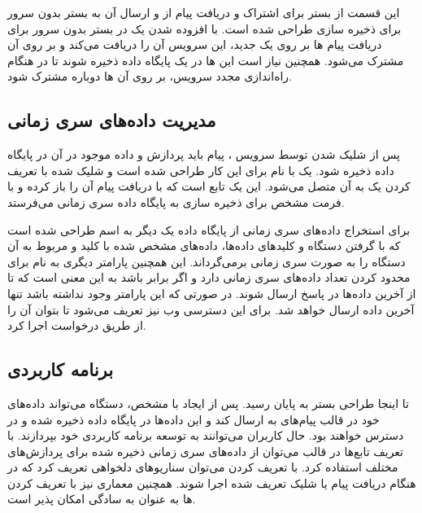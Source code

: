 این قسمت از بستر برای اشتراک و دریافت پیام از   و ارسال آن به بستر بدون سرور برای ذخیره سازی طراحی شده است. با افزوده شدن یک  در بستر بدون سرور برای دریافت پیام ها بر روی یک  جدید، این سرویس آن را دریافت می‌کند و بر روی آن  مشترک می‌شود. همچنین نیاز است این  ها در یک پایگاه داده ذخیره شوند تا در هنگام راه‌اندازی مجدد سرویس، بر روی آن  ها دوباره مشترک شود.

\subsection{مدیریت داده‌های سری زمانی}

پس از شلیک شدن  توسط سرویس ، پیام باید پردازش و داده موجود در آن در پایگاه داده ذخیره شود. یک  با نام  برای این کار طراحی شده‌ است و  شلیک شده با تعریف کردن یک  به آن متصل می‌شود. این  یک تابع است که با دریافت پیام آن را باز کرده و با فرمت مشخص برای ذخیره سازی به پایگاه داده سری زمانی می‌فرستد.

برای استخراج داده‌های سری زمانی از پایگاه داده یک  دیگر به اسم  طراحی شده است که با گرفتن  دستگاه و کلید‌های داده‌ها، داده‌های مشخص شده با کلید و مربوط به آن دستگاه را به صورت سری زمانی برمی‌گرداند. این  همچنین پارامتر دیگری به نام  برای محدود کردن تعداد داده‌های سری زمانی دارد و اگر برابر  باشد به این معنی است که  تا از آخرین داده‌ها در پاسخ ارسال شوند. در صورتی که این پارامتر وجود نداشته باشد تنها آخرین داده ارسال خواهد شد. برای این  دسترسی وب نیز تعریف می‌شود تا بتوان آن را از طریق درخواست  اجرا کرد.

\subsection{برنامه کاربردی}

تا اینجا طراحی بستر به پایان رسید. پس از ایجاد  با  مشخص، دستگاه می‌تواند داده‌های خود در قالب پیام‌های  به  ارسال کند و این داده‌ها در پایگاه داده ذخیره شده و در دسترس خواهند بود. حال کاربران می‌توانند به توسعه برنامه کاربردی خود بپردازند. با تعریف تابع‌ها در قالب  می‌توان از داده‌های سری زمانی ذخیره شده برای پردازش‌های مختلف استفاده کرد. با تعریف کردن  می‌توان سناریوهای دلخواهی تعریف کرد که در هنگام دریافت پیام یا شلیک  تعریف شده اجرا شوند. همچنین معماری  نیز با تعریف کردن  ها به عنوان  به سادگی امکان پذیر است.


